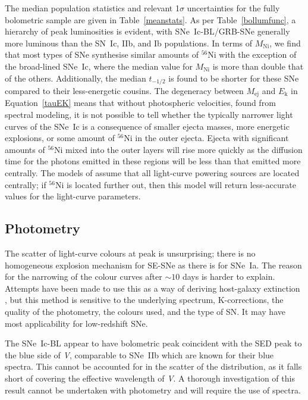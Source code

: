 \documentclass[a4paper,fleqn,usenatbib]{mnras}
\begin{document}
The median population statistics and relevant 1$\sigma$ uncertainties for the fully bolometric sample are given in Table~\ref{meanstats}. As per Table~\ref{bollumfunc}, a hierarchy of peak luminosities is evident, with SNe~Ic-BL/GRB-SNe generally more luminous than the SN~Ic, IIb, and Ib populations. In terms of $M_{\mathrm{Ni}}$, we find that most types of SNe synthesise similar amounts of $^{56}$Ni with the exception of the broad-lined SNe~Ic, where the median value for $M_{\mathrm{Ni}}$ is more than double that of the others. Additionally, the median $t_{-1/2}$ is found to be shorter for these SNe compared to their less-energetic cousins. The degeneracy between $M_{\mathrm{ej}}$ and $E_{\mathrm{k}}$ in Equation~\ref{tauEK} means that without photospheric velocities, found from spectral modeling, it is not possible to tell whether the typically narrower light curves of the SNe~Ic is a consequence of smaller ejecta masses, more energetic explosions, or some amount of $^{56}$Ni in the outer ejecta. Ejecta with significant amounts of $^{56}$Ni mixed into the outer layers will rise more quickly as the diffusion time for the photons emitted in these regions will be less than that emitted more centrally. The models of \cite{Arnett1982} assume that all light-curve powering sources are located centrally; if $^{56}$Ni is located further out, then this model will return less-accurate values for the light-curve parameters.
\subsection{Photometry}
The scatter of light-curve colours at peak is unsurprising; there is no homogeneous explosion mechanism for SE-SNe as there is for SNe~Ia. The reason for the narrowing of the colour curves after $\sim 10$ days is harder to explain. Attempts have been made to use this as a way of deriving host-galaxy extinction \citep[e.g.,][]{Drout2011,Taddia2015}, but this method is sensitive to the underlying spectrum, K-corrections, the quality of the photometry, the colours used, and the type of SN. It may have most applicability for low-redshift SNe. 

The SNe~Ic-BL appear to have bolometric peak coincident with the SED peak to the blue side of \textit{V}, comparable to SNe~IIb which are known for their blue spectra. This cannot be accounted for in the scatter of the distribution, as it falls short of covering the effective wavelength of \textit{V}. A thorough investigation of this result cannot be undertaken with photometry and will require the use of spectra.
\end{document}

